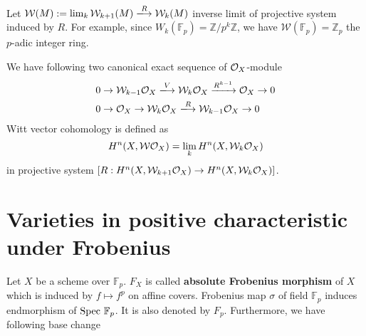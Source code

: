 \documentclass[11pt,a4paper]{scmsnotes}
\begin{document}
Let $\mathcal{W}(M):= \lim_{k} \mathcal{W}_{k+1}(M) \xlongrightarrow{R} \mathcal{W}_{k}(M)$ inverse limit of projective system induced by $R$. For example, since $W_k(\mathbb{F}_p) = \mathbb{Z}/p^k \mathbb{Z}$, we have 
$\mathcal{W}(\mathbb{F}_p) = \mathbb{Z}_p$ the $p$-adic integer ring. 

We have following two canonical exact sequence of $\mathcal{O}_{X}$-module
\begin{align}
	&0 \to \mathcal{W}_{k-1}\sheaf{X} \xlongrightarrow{V} \mathcal{W}_k \sheaf{X} \xrightarrow{R^{k-1}} \sheaf{X} \to 0\\
	&0 \to \sheaf{X} \to \mathcal{W}_{k}\sheaf{X} \xlongrightarrow{R} \mathcal{W}_{k-1} \sheaf{X} \to 0
\end{align} 
Witt vector cohomology is defined as 
\[
H^n(X,\mathcal{W}\mathcal{O}_{X})= \lim_{k} H^n(X,\mathcal{W}_k \mathcal{O}_{X})
\]
in projective system $[R:H^n(X,\mathcal{W}_{k+1}\mathcal{O}_{X}) \to H^n(X,\mathcal{W}_{k}\mathcal{O}_{X})]$.

\section{Varieties in positive characteristic under Frobenius}
Let $X$ be a scheme over $\mathbb{F}_p$. $F_X$ is called \textbf{absolute Frobenius morphism} of $X$ which is induced by $f \mapsto f^p$ on affine covers. Frobenius map $\sigma$ of field $\mathbb{F}_p$ induces endmorphism of $\text{Spec } \mathbb{F}_p$. It is also denoted by $F_p$. Furthermore, we have following base change
\end{document}

